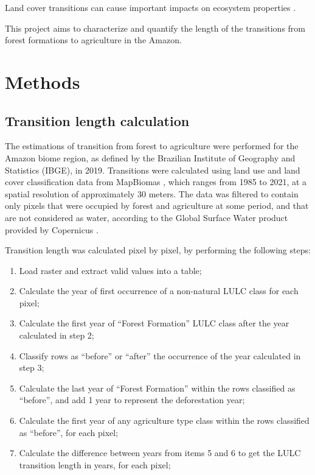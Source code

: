 \documentclass[essd, manuscript]{copernicus}
\begin{document}
Land cover transitions can cause important impacts on ecosystem properties \citep{Nunes2022}.

This project aims to characterize and quantify the length of the transitions from forest formations to agriculture in the Amazon.

\section{Methods}

\subsection{Transition length calculation}

The estimations of transition from forest to agriculture were performed for the Amazon biome region, as defined by the Brazilian Institute of Geography and Statistics (IBGE), in 2019.
Transitions were calculated using land use and land cover classification data from MapBiomas \citep{Souza2020}, which ranges from 1985 to 2021, at a spatial resolution of approximately 30 meters.
The data was filtered to contain only pixels that were occupied by forest and agriculture at some period, and that are not considered as water, according to the Global Surface Water product provided by Copernicus \citep{Pekel2016}.

Transition length was calculated pixel by pixel, by performing the following steps:

\begin{enumerate}
\def\labelenumi{\arabic{enumi}.}
\item
  Load raster and extract valid values into a table;
\item
  Calculate the year of first occurrence of a non-natural LULC class for each pixel;
\item
  Calculate the first year of ``Forest Formation'' LULC class after the year calculated in step 2;
\item
  Classify rows as ``before'' or ``after'' the occurrence of the year calculated in step 3;
\item
  Calculate the last year of ``Forest Formation'' within the rows classified as ``before'', and add 1 year to represent the deforestation year;
\item
  Calculate the first year of any agriculture type class within the rows classified as ``before'', for each pixel;
\item
  Calculate the difference between years from items 5 and 6 to get the LULC transition length in years, for each pixel;
\end{enumerate}
\end{document}
